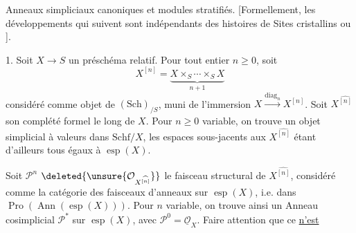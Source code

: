 
Anneaux simpliciaux canoniques et modules
stratifiés. 
[Formellement, les développements qui suivent sont indépendants
des  histoires de Sites cristallins ou
].

1. Soit $X\longrightarrow S$ un préschéma relatif.
Pour tout entier $n\geq0$, soit
\[
X^{[n]}=\underbrace{X\times_S\cdots\times_S X}_{n+1}
\]
considéré comme objet 
de $(\mathrm{Sch})_{/S}$, muni de 
l'immersion
$X\xrightarrow{\operatorname{diag}_n}X^{[n]}$.
Soit $X^{\widehat{[n]}}$ son complété formel le long de $X$.
Pour $n\geq0$ variable, on trouve un objet simplicial à valeurs
dans $\mathrm{Schf}/X$, les espaces sous-jacents aux
$X^{\widehat{[n]}}$ étant d'ailleurs tous égaux à $\operatorname{esp}(X)$.

Soit $\mathcal P^n$
$\deleted{\unsure{\mathcal O_{X^{\widehat{[n]}}}}}$
le faisceau structural de $X^{\widehat{[n]}}$,
 considéré comme
la catégorie des faisceaux d'anneaux sur $\operatorname{esp}(X)$,
i.e. dans $\operatorname{Pro}(\operatorname{Ann}(\operatorname{esp}(X)))$.
Pour $n$ variable, on trouve ainsi un Anneau cosimplicial
$\mathcal P^*$ sur $\operatorname{esp}(X)$, avec
$\mathcal P^0=\underline{\mathcal O}_X$.
Faire attention que ce \uline{n'est}
